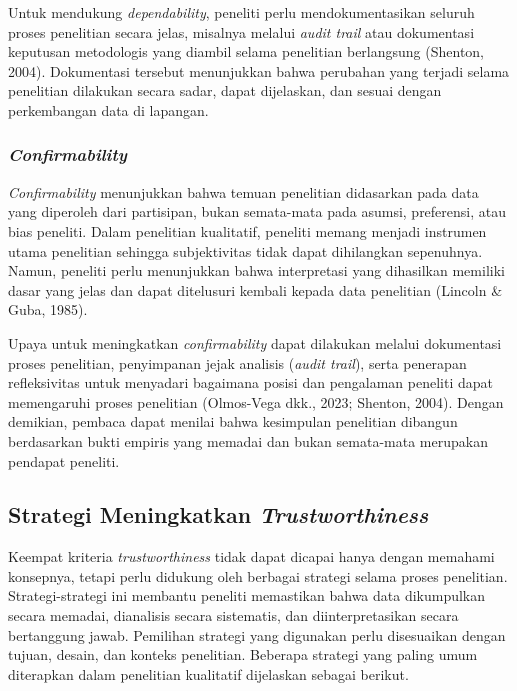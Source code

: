 \documentclass[
  indonesian,
  letterpaper,
  DIV=11,
  numbers=noendperiod]{scrreprt}
\begin{document}
Untuk mendukung \emph{dependability}, peneliti perlu mendokumentasikan
seluruh proses penelitian secara jelas, misalnya melalui \emph{audit
trail} atau dokumentasi keputusan metodologis yang diambil selama
penelitian berlangsung (Shenton, 2004). Dokumentasi tersebut menunjukkan
bahwa perubahan yang terjadi selama penelitian dilakukan secara sadar,
dapat dijelaskan, dan sesuai dengan perkembangan data di lapangan.

\subsubsection{\texorpdfstring{\emph{Confirmability}}{Confirmability}}\label{confirmability}

\emph{Confirmability} menunjukkan bahwa temuan penelitian didasarkan
pada data yang diperoleh dari partisipan, bukan semata-mata pada asumsi,
preferensi, atau bias peneliti. Dalam penelitian kualitatif, peneliti
memang menjadi instrumen utama penelitian sehingga subjektivitas tidak
dapat dihilangkan sepenuhnya. Namun, peneliti perlu menunjukkan bahwa
interpretasi yang dihasilkan memiliki dasar yang jelas dan dapat
ditelusuri kembali kepada data penelitian (Lincoln \& Guba, 1985).

Upaya untuk meningkatkan \emph{confirmability} dapat dilakukan melalui
dokumentasi proses penelitian, penyimpanan jejak analisis (\emph{audit
trail}), serta penerapan refleksivitas untuk menyadari bagaimana posisi
dan pengalaman peneliti dapat memengaruhi proses penelitian (Olmos-Vega
dkk., 2023; Shenton, 2004). Dengan demikian, pembaca dapat menilai bahwa
kesimpulan penelitian dibangun berdasarkan bukti empiris yang memadai
dan bukan semata-mata merupakan pendapat peneliti.

\subsection{\texorpdfstring{Strategi Meningkatkan
\emph{Trustworthiness}}{Strategi Meningkatkan Trustworthiness}}\label{sec-strategi}

Keempat kriteria \emph{trustworthiness} tidak dapat dicapai hanya dengan
memahami konsepnya, tetapi perlu didukung oleh berbagai strategi selama
proses penelitian. Strategi-strategi ini membantu peneliti memastikan
bahwa data dikumpulkan secara memadai, dianalisis secara sistematis, dan
diinterpretasikan secara bertanggung jawab. Pemilihan strategi yang
digunakan perlu disesuaikan dengan tujuan, desain, dan konteks
penelitian. Beberapa strategi yang paling umum diterapkan dalam
penelitian kualitatif dijelaskan sebagai berikut.
\end{document}
